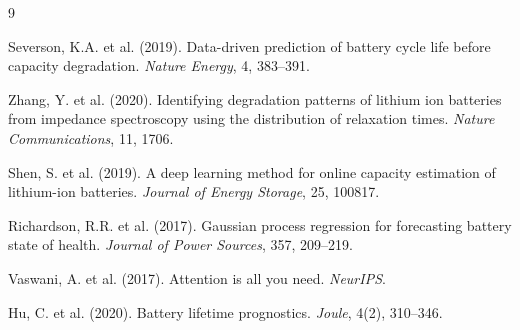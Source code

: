 \documentclass[11pt,a4paper]{article}
\begin{document}
\begin{thebibliography}{9}

Severson, K.A. et al. (2019).
Data-driven prediction of battery cycle life before capacity degradation.
\textit{Nature Energy}, 4, 383--391.

Zhang, Y. et al. (2020).
Identifying degradation patterns of lithium ion batteries from impedance spectroscopy using the distribution of relaxation times.
\textit{Nature Communications}, 11, 1706.

Shen, S. et al. (2019).
A deep learning method for online capacity estimation of lithium-ion batteries.
\textit{Journal of Energy Storage}, 25, 100817.

Richardson, R.R. et al. (2017).
Gaussian process regression for forecasting battery state of health.
\textit{Journal of Power Sources}, 357, 209--219.

Vaswani, A. et al. (2017).
Attention is all you need.
\textit{NeurIPS}.

Hu, C. et al. (2020).
Battery lifetime prognostics.
\textit{Joule}, 4(2), 310--346.

\end{thebibliography}
\end{document}
